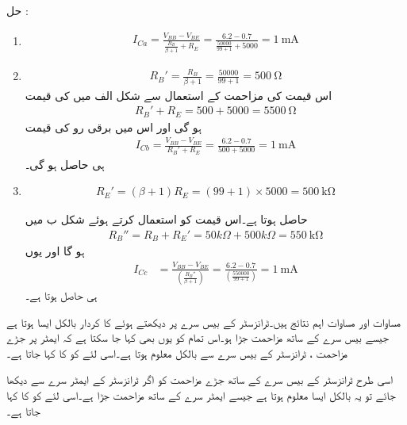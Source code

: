 حل :
\begin{enumerate}
\item
\begin{align*}
I_{Ca}=\frac{V_{BB}-V_{BE}}{\frac{R_B}{\beta+1}+R_E}=\frac{6.2-0.7}{\frac{50000}{99+1}+5000} =\SI{1}{\milli \ampere}
\end{align*}
\item
\begin{align*}
R_B'=\frac{R_B}{\beta+1}=\frac{50000}{99+1}=\SI{500}{\ohm}
\end{align*}
اس قیمت کی مزاحمت کے استعمال سے شکل  الف میں   کی قیمت 
\begin{align*}
R_B'+R_E=500+5000=\SI{5500}{\ohm} 
\end{align*} 
 ہو گی اور اس میں برقی رو کی قیمت
\begin{align*}
I_{Cb}=\frac{V_{BB}-V_{BE}}{R_B'+R_E}=\frac{6.2-0.7}{500+5000}=\SI{1}{\milli \ampere}
\end{align*}
ہی حاصل ہو گی۔

\item
\begin{align*}
R_E'=(\beta+1)R_E =(99+1) \times 5000=\SI{500}{\kilo \ohm}
\end{align*}

حاصل ہوتا ہے۔اس قیمت  کو استعمال کرتے ہوئے شکل  ب میں
\begin{align*}
R_B''=R_B+R_E'=50 k \Omega +500k \Omega = \SI{550}{\kilo \ohm} 
\end{align*}
 ہو گا اور یوں
\begin{align*}
I_{Cc}&=\frac{V_{BB}-V_{BE}}{\left (\frac{R_B''}{\beta+1} \right )}=\frac{6.2-0.7}{\left (\frac{550000}{99+1} \right )}=\SI{1}{\milli \ampere}
\end{align*}
ہی حاصل ہوتا ہے۔
\end{enumerate}




مساوات   اور مساوات   اہم نتائج ہیں۔ٹرانزسٹر کے بیس سرے پر دیکھتے ہوئے  کا کردار بالکل ایسا ہوتا ہے جیسے بیس سرے کے ساتھ مزاحمت  جڑا ہو۔اس تمام کو یوں بھی کہا جا سکتا ہے کہ ایمٹر پر جڑے مزاحمت  ، ٹرانزسٹر کے بیس سرے سے بالکل   معلوم ہوتا ہے۔اسی لئے  کو  کا  کہا جاتا ہے۔

اسی طرح ٹرانزسٹر کے بیس سرے کے ساتھ جڑے مزاحمت  کو اگر ٹرانزسٹر کے ایمٹر سرے سے دیکھا جائے تو یہ بالکل ایسا معلوم ہوتا ہے جیسے  ایمٹر سرے کے ساتھ مزاحمت  جڑا ہے۔اسی لئے  کو  کا  کہا جاتا ہے۔

